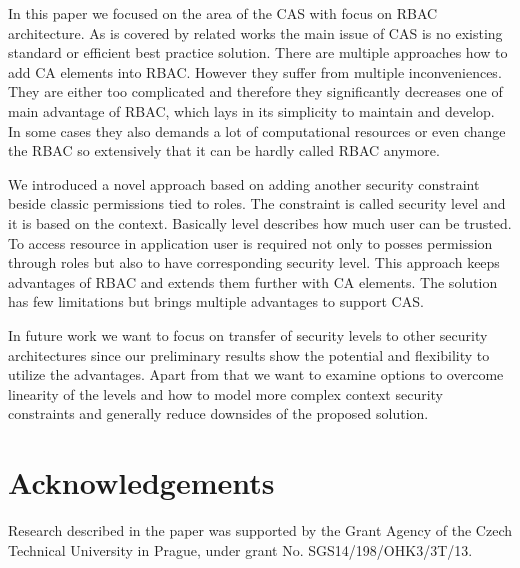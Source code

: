 \documentclass{poster15}
\begin{document}
In this paper we focused on the area of the CAS with focus on RBAC architecture. As is covered by related works the main issue of CAS is no existing standard or efficient best practice solution. There are multiple approaches how to add CA elements into RBAC. However they suffer from multiple inconveniences. They are either too complicated and therefore they significantly decreases one of main advantage of RBAC, which lays in its simplicity to maintain and develop. In some cases they also demands a lot of computational resources or even change the RBAC so extensively that it can be hardly called RBAC anymore.

We introduced a novel approach based on adding another security constraint beside classic permissions tied to roles. The constraint is called security level and it is based on the context. Basically level describes how much user can be trusted. To access resource in application user is required not only to posses permission through roles but also to have corresponding security level. This approach keeps advantages of RBAC and extends them further with CA elements. The solution has few limitations but brings multiple advantages to support CAS. 

In future work we want to focus on transfer of security levels to other security architectures since our preliminary results show the potential and flexibility to utilize the advantages. Apart from that we want to examine options to overcome linearity of the levels and how to model more complex context security constraints and generally reduce downsides of the proposed solution.

\section*{Acknowledgements}
Research described in the paper was supported by the
Grant Agency of the Czech Technical University in Prague, under grant No. SGS14/198/OHK3/3T/13.
\end{document}
